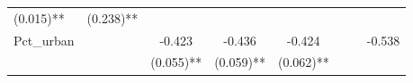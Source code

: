 \documentclass[12pt,twoside]{reedthesis}
\begin{document}
\begin{longtable}[]{@{}lccccccc@{}}
\begin{minipage}[t]{0.10\columnwidth}
  (0.015)**\strut
  \end{minipage} & \begin{minipage}[t]{0.10\columnwidth}\centering\strut
  (0.238)**\strut
  \end{minipage}\tabularnewline
  \begin{minipage}[t]{0.11\columnwidth}\raggedright\strut
  Pct\_urban\strut
  \end{minipage} & \begin{minipage}[t]{0.08\columnwidth}\centering\strut
  \strut
  \end{minipage} & \begin{minipage}[t]{0.10\columnwidth}\centering\strut
  -0.423\strut
  \end{minipage} & \begin{minipage}[t]{0.10\columnwidth}\centering\strut
  -0.436\strut
  \end{minipage} & \begin{minipage}[t]{0.10\columnwidth}\centering\strut
  -0.424\strut
  \end{minipage} & \begin{minipage}[t]{0.10\columnwidth}\centering\strut
  \strut
  \end{minipage} & \begin{minipage}[t]{0.10\columnwidth}\centering\strut
  \strut
  \end{minipage} & \begin{minipage}[t]{0.10\columnwidth}\centering\strut
  -0.538\strut
  \end{minipage}\tabularnewline
  \begin{minipage}[t]{0.11\columnwidth}\raggedright\strut
  \strut
  \end{minipage} & \begin{minipage}[t]{0.08\columnwidth}\centering\strut
  \strut
  \end{minipage} & \begin{minipage}[t]{0.10\columnwidth}\centering\strut
  (0.055)**\strut
  \end{minipage} & \begin{minipage}[t]{0.10\columnwidth}\centering\strut
  (0.059)**\strut
  \end{minipage} & \begin{minipage}[t]{0.10\columnwidth}\centering\strut
  (0.062)**\strut
  \end{minipage} & \begin{minipage}[t]{0.10\columnwidth}\centering\strut
  \strut
  \end{minipage} & \begin{minipage}[t]{0.10\columnwidth}\centering\strut

\end{minipage}
\end{longtable}
\end{document}
